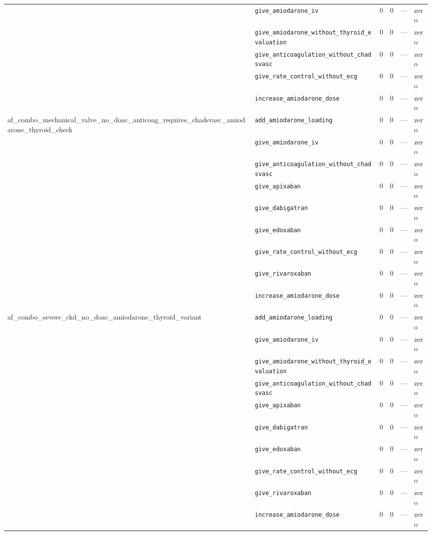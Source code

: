 \begin{table}[ht]
\begin{tabular}{llrrrl}
 & \texttt{give\_amiodarone\_iv} & 0 & 0 & — & zero \\
 & \texttt{give\_amiodarone\_without\_thyroid\_evaluation} & 0 & 0 & — & zero \\
 & \texttt{give\_anticoagulation\_without\_chadsvasc} & 0 & 0 & — & zero \\
 & \texttt{give\_rate\_control\_without\_ecg} & 0 & 0 & — & zero \\
 & \texttt{increase\_amiodarone\_dose} & 0 & 0 & — & zero \\
\midrule
af\_combo\_mechanical\_valve\_no\_doac\_anticoag\_requires\_chadsvasc\_amiodarone\_thyroid\_check & \texttt{add\_amiodarone\_loading} & 0 & 0 & — & zero \\
 & \texttt{give\_amiodarone\_iv} & 0 & 0 & — & zero \\
 & \texttt{give\_anticoagulation\_without\_chadsvasc} & 0 & 0 & — & zero \\
 & \texttt{give\_apixaban} & 0 & 0 & — & zero \\
 & \texttt{give\_dabigatran} & 0 & 0 & — & zero \\
 & \texttt{give\_edoxaban} & 0 & 0 & — & zero \\
 & \texttt{give\_rate\_control\_without\_ecg} & 0 & 0 & — & zero \\
 & \texttt{give\_rivaroxaban} & 0 & 0 & — & zero \\
 & \texttt{increase\_amiodarone\_dose} & 0 & 0 & — & zero \\
\midrule
af\_combo\_severe\_ckd\_no\_doac\_amiodarone\_thyroid\_variant & \texttt{add\_amiodarone\_loading} & 0 & 0 & — & zero \\
 & \texttt{give\_amiodarone\_iv} & 0 & 0 & — & zero \\
 & \texttt{give\_amiodarone\_without\_thyroid\_evaluation} & 0 & 0 & — & zero \\
 & \texttt{give\_anticoagulation\_without\_chadsvasc} & 0 & 0 & — & zero \\
 & \texttt{give\_apixaban} & 0 & 0 & — & zero \\
 & \texttt{give\_dabigatran} & 0 & 0 & — & zero \\
 & \texttt{give\_edoxaban} & 0 & 0 & — & zero \\
 & \texttt{give\_rate\_control\_without\_ecg} & 0 & 0 & — & zero \\
 & \texttt{give\_rivaroxaban} & 0 & 0 & — & zero \\
 & \texttt{increase\_amiodarone\_dose} & 0 & 0 & — & zero \\
\midrule

\end{tabular}
\end{table}
